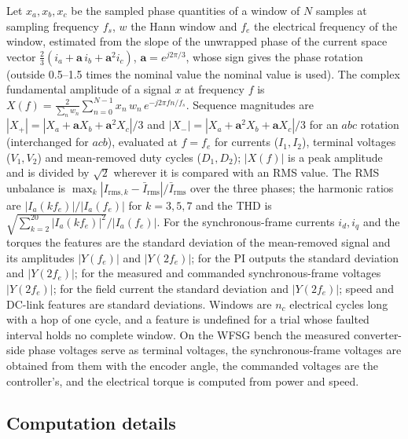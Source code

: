 \begin{appendices}
Let $x_a, x_b, x_c$ be the sampled phase quantities of a window of $N$ samples at sampling frequency $f_s$, $w$ the Hann window and $f_e$ the electrical frequency of the window, estimated from the slope of the unwrapped phase of the current space vector $\tfrac{2}{3}(i_a + \mathbf{a}\, i_b + \mathbf{a}^2 i_c)$, $\mathbf{a}=e^{j2\pi/3}$, whose sign gives the phase rotation (outside 0.5--1.5 times the nominal value the nominal value is used). The complex fundamental amplitude of a signal $x$ at frequency $f$ is $X(f) = \frac{2}{\sum_n w_n}\sum_{n=0}^{N-1} x_n\, w_n\, e^{-j2\pi f n/f_s}$. Sequence magnitudes are $|X_+| = |X_a + \mathbf{a}X_b + \mathbf{a}^2X_c|/3$ and $|X_-| = |X_a + \mathbf{a}^2X_b + \mathbf{a}X_c|/3$ for an $abc$ rotation (interchanged for $acb$), evaluated at $f=f_e$ for currents ($I_1, I_2$), terminal voltages ($V_1, V_2$) and mean-removed duty cycles ($D_1, D_2$); $|X(f)|$ is a peak amplitude and is divided by $\sqrt2$ wherever it is compared with an RMS value. The RMS unbalance is $\max_k |I_{\mathrm{rms},k} - \bar I_{\mathrm{rms}}| / \bar I_{\mathrm{rms}}$ over the three phases; the harmonic ratios are $|I_a(kf_e)|/|I_a(f_e)|$ for $k=3,5,7$ and the THD is $\sqrt{\sum_{k=2}^{20}|I_a(kf_e)|^2}/|I_a(f_e)|$. For the synchronous-frame currents $i_d, i_q$ and the torques the features are the standard deviation of the mean-removed signal and its amplitudes $|Y(f_e)|$ and $|Y(2f_e)|$; for the PI outputs the standard deviation and $|Y(2f_e)|$; for the measured and commanded synchronous-frame voltages $|Y(2f_e)|$; for the field current the standard deviation and $|Y(2f_e)|$; speed and DC-link features are standard deviations. Windows are $n_c$ electrical cycles long with a hop of one cycle, and a feature is undefined for a trial whose faulted interval holds no complete window. On the WFSG bench the measured converter-side phase voltages serve as terminal voltages, the synchronous-frame voltages are obtained from them with the encoder angle, the commanded voltages are the controller's, and the electrical torque is computed from power and speed.

\subsection{Computation details}\label{app:computation}


\end{appendices}
